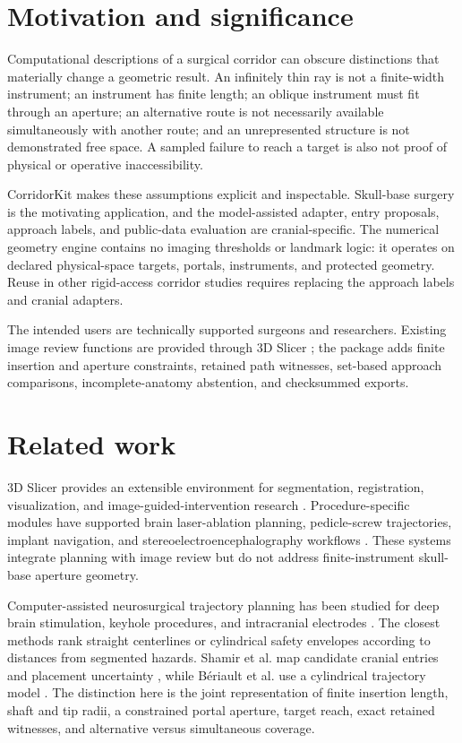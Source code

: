 \documentclass[preprint,12pt]{elsarticle}
\begin{document}
\section{Motivation and significance}

Computational descriptions of a surgical corridor can obscure distinctions that materially change a geometric result. An infinitely thin ray is not a finite-width instrument; an instrument has finite length; an oblique instrument must fit through an aperture; an alternative route is not necessarily available simultaneously with another route; and an unrepresented structure is not demonstrated free space. A sampled failure to reach a target is also not proof of physical or operative inaccessibility.

CorridorKit makes these assumptions explicit and inspectable. Skull-base surgery is the motivating application, and the model-assisted adapter, entry proposals, approach labels, and public-data evaluation are cranial-specific. The numerical geometry engine contains no imaging thresholds or landmark logic: it operates on declared physical-space targets, portals, instruments, and protected geometry. Reuse in other rigid-access corridor studies requires replacing the approach labels and cranial adapters.

The intended users are technically supported surgeons and researchers. Existing image review functions are provided through 3D Slicer \citep{slicer}; the package adds finite insertion and aperture constraints, retained path witnesses, set-based approach comparisons, incomplete-anatomy abstention, and checksummed exports.

\section{Related work}

3D Slicer provides an extensible environment for segmentation, registration, visualization, and image-guided-intervention research \citep{slicer,ungi2016}. Procedure-specific modules have supported brain laser-ablation planning, pedicle-screw trajectories, implant navigation, and stereoelectroencephalography workflows \citep{yeniaras2014,muralidharan2018,chen2017,narizzano2017}. These systems integrate planning with image review but do not address finite-instrument skull-base aperture geometry.

Computer-assisted neurosurgical trajectory planning has been studied for deep brain stimulation, keyhole procedures, and intracranial electrodes \citep{brunenberg2007,beriault2012,shamir2012,trope2015,sparks2017,wankhede2022}. The closest methods rank straight centerlines or cylindrical safety envelopes according to distances from segmented hazards. Shamir et al. map candidate cranial entries and placement uncertainty \citep{shamir2012}, while Bériault et al. use a cylindrical trajectory model \citep{beriault2012}. The distinction here is the joint representation of finite insertion length, shaft and tip radii, a constrained portal aperture, target reach, exact retained witnesses, and alternative versus simultaneous coverage.
\end{document}
